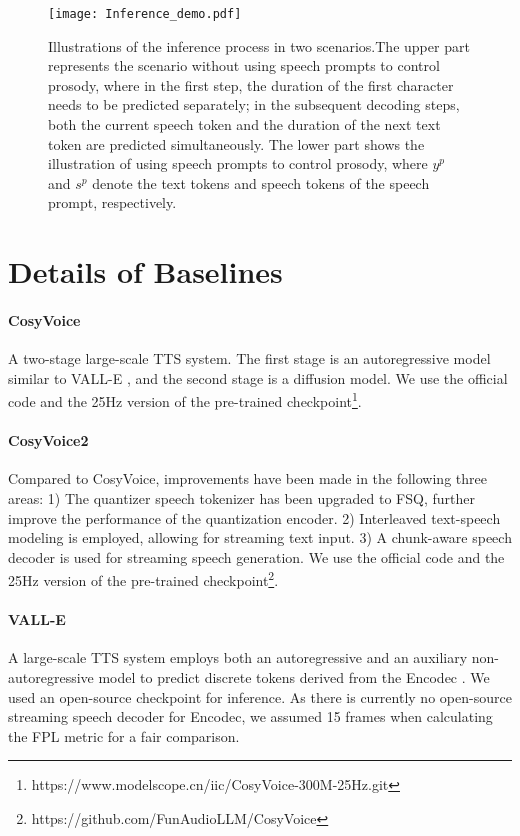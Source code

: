 
\begin{figure*}
    \centering
    \texttt{[image: Inference\_demo.pdf]}
    \caption{Illustrations of the inference process in two scenarios.The upper part represents the scenario without using speech prompts to control prosody, where in the first step, the duration of the first character needs to be predicted separately; in the subsequent decoding steps, both the current speech token and the duration of the next text token are predicted simultaneously.  The lower part shows the illustration of using speech prompts to control prosody, where $y^p$ and $s^p$ denote the text tokens and speech tokens of the speech prompt, respectively.}
    \label{fig2}
\end{figure*}


\section{Details of Baselines}
\label{baselines}

\paragraph{CosyVoice} A two-stage large-scale TTS system. The first stage is an autoregressive model similar to VALL-E \cite{valle}, and the second stage is a diffusion model. We use the official code and the 25Hz version of the pre-trained checkpoint\footnote{https://www.modelscope.cn/iic/CosyVoice-300M-25Hz.git}.

\paragraph{CosyVoice2} Compared to CosyVoice, improvements have been made in the following three areas: 1) The quantizer speech tokenizer has been upgraded to FSQ, further improve the performance of the quantization encoder. 2) Interleaved text-speech modeling is employed, allowing for streaming text input. 3) A chunk-aware speech decoder is used for streaming speech generation. We use the official code and the 25Hz version of the pre-trained checkpoint\footnote{https://github.com/FunAudioLLM/CosyVoice}.


\paragraph{VALL-E} A large-scale TTS system employs both an autoregressive and an auxiliary non-autoregressive model to predict discrete tokens derived from the Encodec \cite{encodec}. We used an open-source checkpoint for inference. As there is currently no open-source streaming speech decoder for Encodec, we assumed 15 frames when calculating the FPL metric for a fair comparison.

